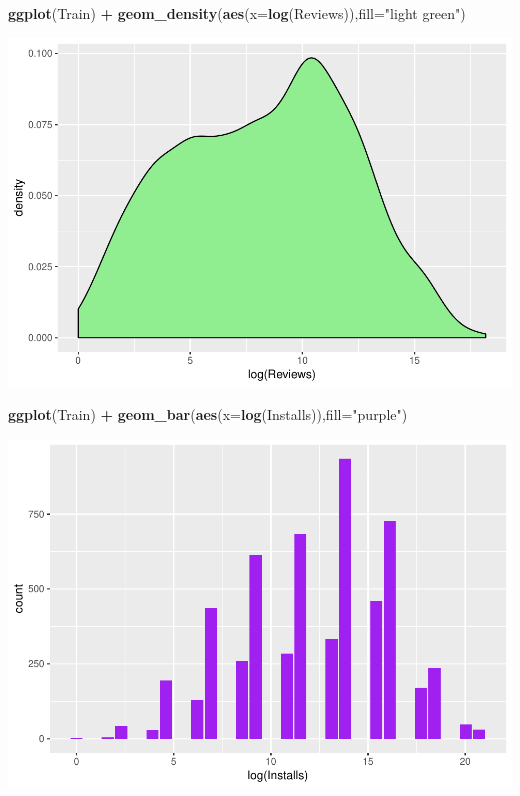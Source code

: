 \documentclass[]{article}
\newenvironment{Shaded}{\begin{snugshade}}{\end{snugshade}}
\newcommand{\DataTypeTok}[1]{\textcolor[rgb]{0.13,0.29,0.53}{#1}}
\newcommand{\KeywordTok}[1]{\textcolor[rgb]{0.13,0.29,0.53}{\textbf{#1}}}
\newcommand{\NormalTok}[1]{#1}
\newcommand{\OperatorTok}[1]{\textcolor[rgb]{0.81,0.36,0.00}{\textbf{#1}}}
\newcommand{\StringTok}[1]{\textcolor[rgb]{0.31,0.60,0.02}{#1}}
\begin{document}
\begin{Shaded}
\begin{Highlighting}[]
\KeywordTok{ggplot}\NormalTok{(Train) }\OperatorTok{+}\StringTok{ }\KeywordTok{geom_density}\NormalTok{(}\KeywordTok{aes}\NormalTok{(}\DataTypeTok{x=}\KeywordTok{log}\NormalTok{(Reviews)),}\DataTypeTok{fill=}\StringTok{"light green"}\NormalTok{)}
\end{Highlighting}
\end{Shaded}

\includegraphics{Project_2_Work_files/figure-latex/unnamed-chunk-15-3.pdf}

\begin{Shaded}
\begin{Highlighting}[]
\KeywordTok{ggplot}\NormalTok{(Train) }\OperatorTok{+}\StringTok{ }\KeywordTok{geom_bar}\NormalTok{(}\KeywordTok{aes}\NormalTok{(}\DataTypeTok{x=}\KeywordTok{log}\NormalTok{(Installs)),}\DataTypeTok{fill=}\StringTok{"purple"}\NormalTok{)}
\end{Highlighting}
\end{Shaded}

\includegraphics{Project_2_Work_files/figure-latex/unnamed-chunk-15-4.pdf}
\end{document}
